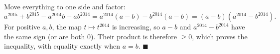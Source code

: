 Move everything to one side and factor:
\[
a^{2015}+b^{2015}-a^{2014}b-ab^{2014}=a^{2014}(a-b)-b^{2014}(a-b)=(a-b)\left(a^{2014}-b^{2014}\right).
\]
For positive $a,b$, the map $t\mapsto t^{2014}$ is increasing, so $a-b$ and $a^{2014}-b^{2014}$ have the same sign (or are both $0$). Their product is therefore $\ge0$, which proves the inequality, with equality exactly when $a=b$. $\blacksquare$
